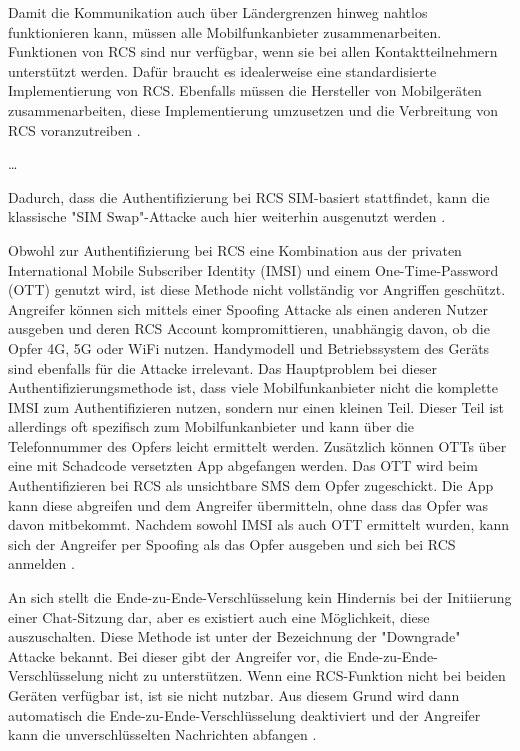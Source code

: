 \documentclass[conference]{IEEEtran}
\begin{document}
Damit die Kommunikation auch über Ländergrenzen hinweg nahtlos funktionieren kann, müssen alle Mobilfunkanbieter zusammenarbeiten.
Funktionen von RCS sind nur verfügbar, wenn sie bei allen Kontaktteilnehmern unterstützt werden.
Dafür braucht es idealerweise eine standardisierte Implementierung von RCS.
Ebenfalls müssen die Hersteller von Mobilgeräten zusammenarbeiten, diese Implementierung umzusetzen und die Verbreitung von RCS voranzutreiben \cite{rcsmno}.

\dots

Dadurch, dass die Authentifizierung bei RCS SIM-basiert stattfindet, kann die klassische "SIM Swap"-Attacke auch hier weiterhin ausgenutzt werden \cite{sendoutsms}.

Obwohl zur Authentifizierung bei RCS eine Kombination aus der privaten International Mobile Subscriber Identity (IMSI) und einem One-Time-Password (OTT) genutzt wird, ist diese Methode nicht vollständig vor Angriffen geschützt.
Angreifer können sich mittels einer Spoofing Attacke als einen anderen Nutzer ausgeben und deren RCS Account kompromittieren, unabhängig davon, ob die Opfer 4G, 5G oder WiFi nutzen.
Handymodell und Betriebssystem des Geräts sind ebenfalls für die Attacke irrelevant.
Das Hauptproblem bei dieser Authentifizierungsmethode ist, dass viele Mobilfunkanbieter nicht die komplette IMSI zum Authentifizieren nutzen, sondern nur einen kleinen Teil.
Dieser Teil ist allerdings oft spezifisch zum Mobilfunkanbieter und kann über die Telefonnummer des Opfers leicht ermittelt werden.
Zusätzlich können OTTs über eine mit Schadcode versetzten App abgefangen werden.
Das OTT wird beim Authentifizieren bei RCS als unsichtbare SMS dem Opfer zugeschickt.
Die App kann diese abgreifen und dem Angreifer übermitteln, ohne dass das Opfer was davon mitbekommt.
Nachdem sowohl IMSI als auch OTT ermittelt wurden, kann sich der Angreifer per Spoofing als das Opfer ausgeben und sich bei RCS anmelden \cite{5gmsg}.

An sich stellt die Ende-zu-Ende-Verschlüsselung kein Hindernis bei der Initiierung einer Chat-Sitzung dar, aber es existiert auch eine Möglichkeit, diese auszuschalten.
Diese Methode ist unter der Bezeichnung der "Downgrade" Attacke bekannt.
Bei dieser gibt der Angreifer vor, die Ende-zu-Ende-Verschlüsselung nicht zu unterstützen.
Wenn eine RCS-Funktion nicht bei beiden Geräten verfügbar ist, ist sie nicht nutzbar.
Aus diesem Grund wird dann automatisch die Ende-zu-Ende-Verschlüsselung deaktiviert und der Angreifer kann die unverschlüsselten Nachrichten abfangen \cite{5gmsg}.
\end{document}
